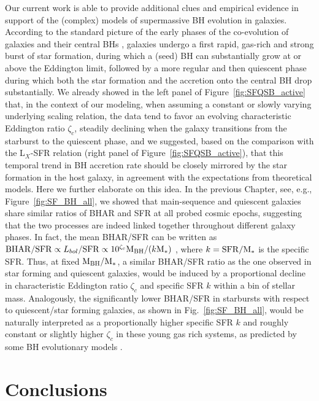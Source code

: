 Our current work is able to provide additional clues and empirical evidence in support of
the (complex) models of supermassive BH evolution in galaxies. According to the standard
picture of the early phases of the co-evolution of galaxies and their central BHs
\citep[e.g.,][]{Granato06,Hopkins06,2018ApJ...857...22L}, galaxies undergo a first rapid, gas-rich and
strong burst of star formation, during which a (seed) BH can substantially grow at or above
the Eddington limit, followed by a more regular and then quiescent phase during which both
the star formation and the accretion onto the central BH drop substantially. We already
showed in the left panel of Figure~\ref{fig:SFQSB_active} that, in the context of our modeling,
when assuming a constant or slowly varying underlying \MBHMS scaling relation, the data tend to
favor an evolving characteristic Eddington ratio $\zeta_c$, steadily declining when the
galaxy transitions from the starburst to the quiescent phase, and we suggested, based on the
comparison with the L$_X$-SFR relation (right panel of Figure~\ref{fig:SFQSB_active}), that
this temporal trend in BH accretion rate should be closely mirrored by the star formation
in the host galaxy, in agreement with the expectations from theoretical models. Here we
further elaborate on this idea.
In the previous Chapter, see, e.g., Figure~\ref{fig:SF_BH_all}, we showed that
main-sequence and quiescent galaxies share similar ratios of BHAR and SFR at all probed
cosmic epochs, suggesting that the two processes are indeed linked together throughout
different galaxy phases.  
In fact, the mean BHAR/SFR can be written as
${\rm BHAR/SFR} \propto L_{bol}/{\rm SFR} \propto 10^{\zeta_c} {\rm M}_{\rm BH}/(k {\rm M}_*)$
, where $k={\rm SFR}/{\rm M}_*$ is the specific SFR. Thus, at fixed
${\rm M}_{\rm BH}/{\rm M}_*$, a similar BHAR/SFR ratio as the one observed in star forming
and quiescent galaxies, would be induced by a proportional decline in characteristic
Eddington ratio $\zeta_c$ and specific SFR $k$ within a bin of stellar mass. Analogously,
the significantly lower BHAR/SFR in starbursts with respect to quiescent/star forming galaxies,
as shown in Fig.~\ref{fig:SF_BH_all}, would be naturally interpreted as a
proportionally higher specific SFR $k$ 
and roughly constant or slightly higher $\zeta_c$ in these young gas rich systems, as
predicted by some BH evolutionary models \citep[e.g.,][]{2014ApJ...782...69L,Aversa15}.

\section{Conclusions}\label{sec:concl}

